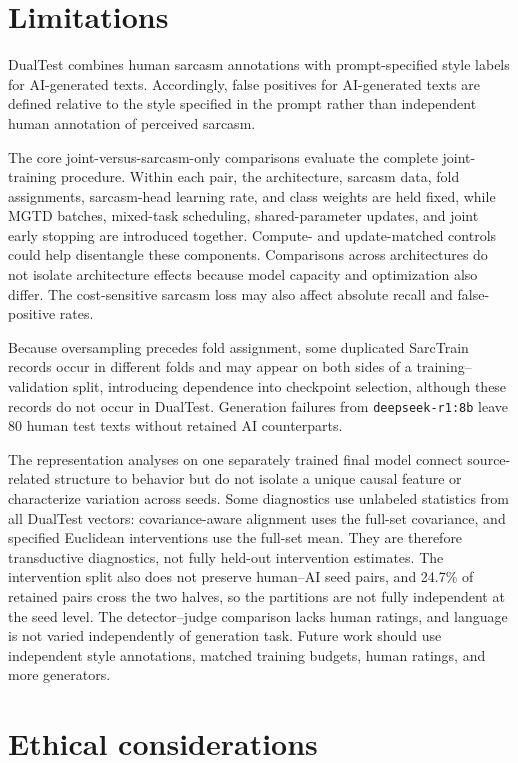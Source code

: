 \documentclass[11pt]{article}
\begin{document}
\section*{Limitations}

DualTest combines human sarcasm annotations with prompt-specified style labels for AI-generated texts. Accordingly, false positives for AI-generated texts are defined relative to the style specified in the prompt rather than independent human annotation of perceived sarcasm.

The core joint-versus-sarcasm-only comparisons evaluate the complete joint-training procedure. Within each pair, the architecture, sarcasm data, fold assignments, sarcasm-head learning rate, and class weights are held fixed, while MGTD batches, mixed-task scheduling, shared-parameter updates, and joint early stopping are introduced together. Compute- and update-matched controls could help disentangle these components. Comparisons across architectures do not isolate architecture effects because model capacity and optimization also differ. The cost-sensitive sarcasm loss may also affect absolute recall and false-positive rates.

Because oversampling precedes fold assignment, some duplicated SarcTrain records occur in different folds and may appear on both sides of a training--validation split, introducing dependence into checkpoint selection, although these records do not occur in DualTest. Generation failures from \texttt{deepseek-r1:8b} leave 80 human test texts without retained AI counterparts.

The representation analyses on one separately trained final model connect source-related structure to behavior but do not isolate a unique causal feature or characterize variation across seeds. Some diagnostics use unlabeled statistics from all DualTest vectors: covariance-aware alignment uses the full-set covariance, and specified Euclidean interventions use the full-set mean. They are therefore transductive diagnostics, not fully held-out intervention estimates. The intervention split also does not preserve human--AI seed pairs, and 24.7\% of retained pairs cross the two halves, so the partitions are not fully independent at the seed level. The detector--judge comparison lacks human ratings, and language is not varied independently of generation task. Future work should use independent style annotations, matched training budgets, human ratings, and more generators.

\section*{Ethical considerations}
\end{document}

